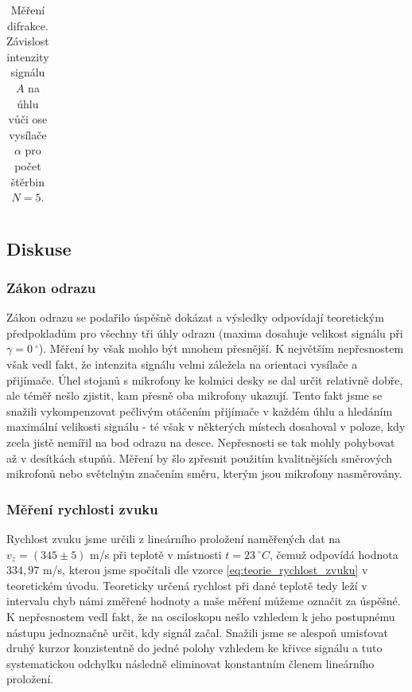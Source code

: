 \documentclass[english]{article}
\begin{document}
\begin{table}
{\begin{tabular}{|r|r|}
	\end{tabular}
	\caption{Měření difrakce. Závislost intenzity signálu $A$ na úhlu vůči ose vysílače $\alpha$ pro počet štěrbin $N=5$.}
	\label{tab:difrakce_n5}	
	}
	
	\end{table}

\subsection{Diskuse}	
    
    \subsubsection{Zákon odrazu}
    	Zákon odrazu se podařilo úspěšně dokázat a výsledky odpovídají teoretickým předpokladům pro všechny tři úhly odrazu (maxima dosahuje velikost signálu při $\gamma = 0\ ^\circ$). Měření by však mohlo být mnohem přesnější. K největším nepřesnostem však vedl fakt, že intenzita signálu velmi záležela na orientaci vysílače a přijímače. Úhel stojanů s mikrofony ke kolmici desky se dal určit relativně dobře, ale téměř nešlo zjistit, kam přesně oba mikrofony ukazují. Tento fakt jsme se snažili vykompenzovat pečlivým otáčením přijímače v každém úhlu a hledáním maximální velikosti signálu - té však v některých místech dosahoval v poloze, kdy zcela jistě nemířil na bod odrazu na desce. Nepřesnosti se tak mohly pohybovat až v desítkách stupňů. Měření by šlo zpřesnit použitím kvalitnějších směrových mikrofonů nebo světelným značením směru, kterým jsou mikrofony nasměrovány. 

	\subsubsection{Měření rychlosti zvuku}
		Rychlost zvuku jsme určili z lineárního proložení naměřených dat na $v_z = (345 \pm 5)$ m/s při teplotě v místnosti $t=23\ ^\circ C$, čemuž odpovídá hodnota $334,97$ m/s, kterou jsme spočítali dle vzorce \ref{eq:teorie_rychlost_zvuku} v teoretickém úvodu. Teoreticky určená rychlost při dané teplotě tedy leží v intervalu chyb námi změřené hodnoty a naše měření můžeme označit za úspěšné. K nepřesnostem vedl fakt, že na osciloskopu nešlo vzhledem k jeho postupnému nástupu jednoznačně určit, kdy signál začal. Snažili jsme se alespoň umisťovat druhý kurzor konzistentně do jedné polohy vzhledem ke křivce signálu a tuto systematickou odchylku následně eliminovat konstantním členem lineárního proložení. 
	
\end{document}
